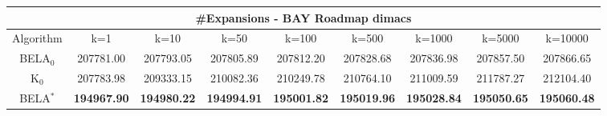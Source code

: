 \begin{tabular}{c|cccccccc}\toprule
\multicolumn{9}{c}{#Expansions - BAY Roadmap dimacs}\\ \midrule
Algorithm & k=1 & k=10 & k=50 & k=100 & k=500 & k=1000 & k=5000 & k=10000 \\ \midrule
BELA$_0$ & 207781.00 & 207793.05 & 207805.89 & 207812.20 & 207828.68 & 207836.98 & 207857.50 & 207866.65 \\
K$_0$ & 207783.98 & 209333.15 & 210082.36 & 210249.78 & 210764.10 & 211009.59 & 211787.27 & 212104.40 \\
BELA$^*$ & \textbf{194967.90} & \textbf{194980.22} & \textbf{194994.91} & \textbf{195001.82} & \textbf{195019.96} & \textbf{195028.84} & \textbf{195050.65} & \textbf{195060.48} \\ \bottomrule 
\end{tabular}
